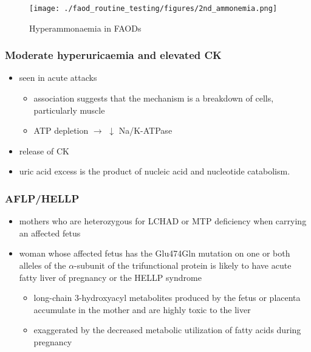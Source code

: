 \documentclass{scrartcl}
\begin{document}
\begin{figure}[htbp]
\centering
\texttt{[image: ./faod\_routine\_testing/figures/2nd\_ammonemia.png]}
\caption{\label{fig:orgcb9b99d}
Hyperammonaemia in FAODs}
\end{figure}


\subsubsection{Moderate hyperuricaemia and elevated CK}
\label{sec:org0087e65}
\begin{itemize}
\item seen in acute attacks 
\begin{itemize}
\item association suggests that the mechanism is a breakdown of
cells, particularly muscle
\item ATP depletion \(\to\) \(\downarrow\) Na/K-ATPase
\end{itemize}
\item release of CK
\item uric acid excess is the product of nucleic acid and nucleotide catabolism.
\end{itemize}

\subsubsection{AFLP/HELLP}
\label{sec:org409ab30}
\begin{itemize}
\item mothers who are heterozygous for LCHAD or MTP deficiency when
carrying an affected fetus
\item woman whose affected fetus has the Glu474Gln mutation on one or
both alleles of the \(\alpha\)-subunit of the trifunctional protein is
likely to have acute fatty liver of pregnancy or the HELLP syndrome 
\begin{itemize}
\item long-chain 3-hydroxyacyl metabolites produced by the fetus or
placenta accumulate in the mother and are highly toxic to the liver
\item exaggerated by the decreased metabolic utilization of fatty acids
during pregnancy
\end{itemize}
\end{itemize}
\end{document}
